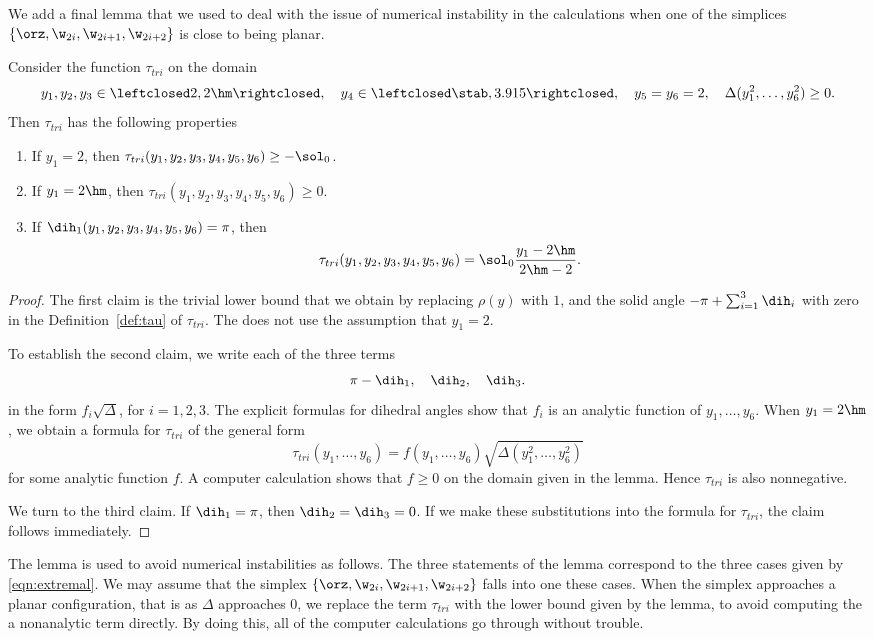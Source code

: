 We add a final lemma that we used to deal with the issue of numerical
instability in the calculations when one of the simplices 
$\{\orz,\w_{2i},\w_{2i+1},\w_{2i+2}\}$ is close to being planar.

\begin{lemma}
Consider the function $\tau_{tri}$
on the domain
\[
y_1,y_2,y_3\in\leftclosed 2,2\hm\rightclosed,
\quad y_4\in\leftclosed \stab,3.915\rightclosed,
\quad y_5=y_6=2,\quad
\Delta(y_1^2,\ldots,y_6^2)\ge0.
\]
Then $\tau_{tri}$ has the following properties
\begin{enumerate}
\item If $y_1=2$, then $\tau_{tri}(y_1,y_2,y_3,y_4,y_5,y_6)\ge -\sol_0$.
\item If $y_1=2\hm$, then $\tau_{tri}(y_1,y_2,y_3,y_4,y_5,y_6)\ge 0$.
\item If $\dih_1(y_1,y_2,y_3,y_4,y_5,y_6) =\pi$, then 
  \[
  \tau_{tri}(y_1,y_2,y_3,y_4,y_5,y_6) = \sol_0\dfrac{y_1 -2\hm}{2\hm-2}.
  \]
\end{enumerate}
\end{lemma}

\begin{proof}
The first claim is the trivial lower bound that we obtain by replacing
$\rho(y)$
with $1$, and the solid angle $-\pi+\sum_{i=1}^3 \dih_i$ with zero
in the Definition~\ref{def:tau} of $\tau_{tri}$.  The does not use the
assumption that $y_1=2$.

To establish the second claim, we write each of the three terms 
\[
\pi-\dih_1,\quad\dih_2,\quad \dih_3.
\]
in the form $f_i\sqrt{\Delta}$, for $i=1,2,3$.  The explicit formulas
for dihedral angles show that $f_i$ is an analytic function of
$y_1,\ldots,y_6$.  When $y_1=2\hm$, we obtain a formula for
$\tau_{tri}$ of the general form
\[
\tau_{tri}(y_1,\ldots,y_6)= f(y_1,\ldots,y_6)\sqrt{\Delta(y_1^2,\ldots,y_6^2)}
\]
for some analytic function $f$.  A computer calculation shows that $f\ge0$
on the domain given in the lemma. Hence $\tau_{tri}$ is also nonnegative.

We turn to the third claim.  If $\dih_1=\pi$, then $\dih_2=\dih_3=0$.
If we make these substitutions into the formula for $\tau_{tri}$, the
claim follows immediately.
\end{proof}

The lemma is used to avoid numerical instabilities as follows.  The
three statements of the lemma correspond to the three cases given by
\eqref{eqn:extremal}.  We may assume that the simplex
$\{\orz,\w_{2i},\w_{2i+1},\w_{2i+2}\}$ falls into one these cases.
When the simplex approaches a planar configuration, that is as
$\Delta$ approaches $0$, we replace the term $\tau_{tri}$ with the
lower bound given by the lemma, to avoid computing the a nonanalytic
term directly.  By doing this, all of the computer calculations go
through without trouble.
